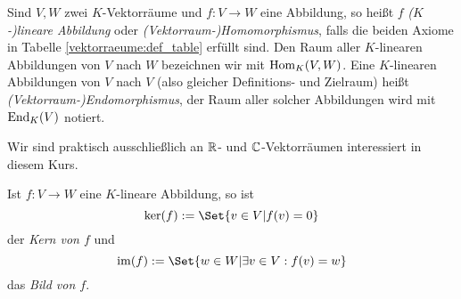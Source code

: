 \begin{definition}
Sind $V,W$ zwei $K$-Vektorräume und $f: V\to W$ eine Abbildung, so heißt $f$ \emph{($K$-)lineare Abbildung} oder \emph{(Vektorraum-)Homomorphismus}, falls die beiden Axiome in Tabelle \ref{vektorraeume:def_table} erfüllt sind. Den Raum aller $K$-linearen Abbildungen von $V$ nach $W$ bezeichnen wir mit $\operatorname{Hom}_K(V,W)$. Eine $K$-linearen Abbildungen von $V$ nach $V$ (also gleicher Definitions- und Zielraum) heißt \emph{(Vektorraum-)Endomorphismus}, der Raum aller solcher Abbildungen wird mit $\operatorname{End}_K(V)$ notiert.
\end{definition}

\begin{remark}
Wir sind praktisch ausschließlich an $\mathbb{R}$- und $\mathbb{C}$-Vektorräumen interessiert in diesem Kurs.
\end{remark}

\begin{definition}
Ist $f: V\to W$ eine $K$-lineare Abbildung, so ist
\[\ker(f) := \Set{v\in V | f(v)=0}\]
der \emph{Kern von $f$} und
\[\im(f) := \Set{w\in W | \exists v\in V: f(v)=w}\]
das \emph{Bild von $f$}.
\end{definition}